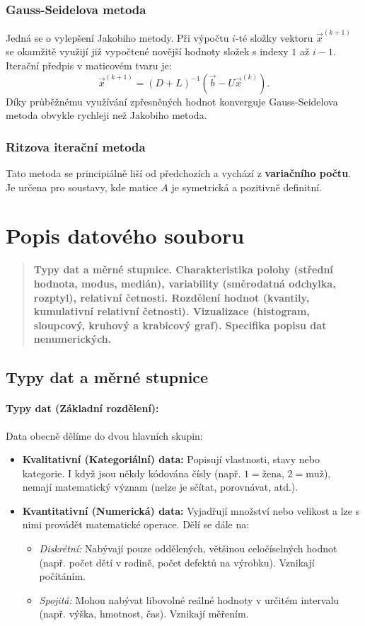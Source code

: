 \subsubsection{Gauss-Seidelova metoda}
Jedná se o vylepšení Jakobiho metody. Při výpočtu $i$-té složky vektoru $\vec{x}^{(k+1)}$ se okamžitě využijí již vypočtené novější hodnoty složek s indexy $1$ až $i-1$. Iterační předpis v maticovém tvaru je:
\[
\vec{x}^{(k+1)} = (D+L)^{-1}(\vec{b} - U\vec{x}^{(k)}).
\]
Díky průběžnému využívání zpřesněných hodnot konverguje Gauss-Seidelova metoda obvykle rychleji než Jakobiho metoda.

\subsubsection{Ritzova iterační metoda}
Tato metoda se principiálně liší od předchozích a vychází z \textbf{variačního počtu}. Je určena pro soustavy, kde matice $A$ je symetrická a pozitivně definitní. 

\section{Popis datového souboru}
\begin{quote}
    \textbf{Typy dat a měrné stupnice. Charakteristika polohy (střední hodnota, modus, medián), variability (směrodatná odchylka, rozptyl), relativní četnosti. Rozdělení hodnot (kvantily, kumulativní relativní četnosti). Vizualizace (histogram, sloupcový, kruhový a krabicový graf). Specifika popisu dat nenumerických.}
\end{quote}

\subsection{Typy dat a měrné stupnice}
\paragraph*{Typy dat (Základní rozdělení):}
Data obecně dělíme do dvou hlavních skupin:
\begin{itemize}
    \item \textbf{Kvalitativní (Kategoriální) data:} Popisují vlastnosti, stavy nebo kategorie. I když jsou někdy kódována čísly (např. $1 = \text{žena}$, $2 = \text{muž}$), nemají matematický význam (nelze je sčítat, porovnávat, atd.).
    \item \textbf{Kvantitativní (Numerická) data:} Vyjadřují množství nebo velikost a lze s nimi provádět matematické operace. Dělí se dále na:
    \begin{itemize}
        \item \textit{Diskrétní:} Nabývají pouze oddělených, většinou celočíselných hodnot (např. počet dětí v rodině, počet defektů na výrobku). Vznikají počítáním.
        \item \textit{Spojitá:} Mohou nabývat libovolné reálné hodnoty v určitém intervalu (např. výška, hmotnost, čas). Vznikají měřením.
    \end{itemize}
\end{itemize}

